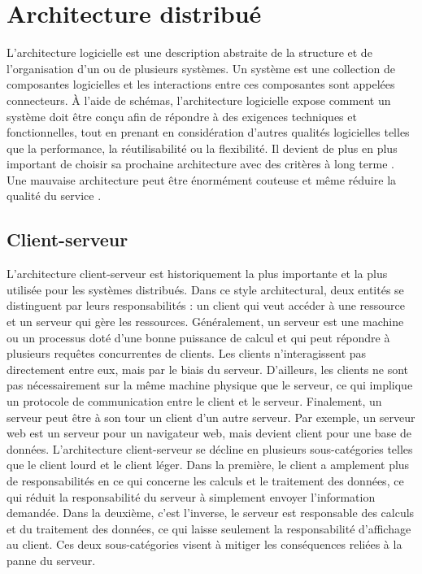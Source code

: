 \section{Architecture distribué}

L'architecture logicielle est une description abstraite de la structure et de l'organisation
d'un ou de plusieurs systèmes. Un système est une collection de composantes logicielles
et les interactions entre ces composantes sont appelées connecteurs. À l'aide de schémas,
l'architecture logicielle expose comment un système doit être conçu aﬁn de répondre à des
exigences techniques et fonctionnelles, tout en prenant en considération d'autres qualités
logicielles telles que la performance, la réutilisabilité ou la ﬂexibilité. Il devient de plus en plus important de choisir sa prochaine architecture avec des critères à long terme \cite{Martens_2010}. Une mauvaise architecture peut être énormément couteuse et même réduire la qualité du service \cite{Kolny_2023}.

\subsection{Client-serveur}
L'architecture client-serveur \cite{Coulouris_2012} est historiquement la plus importante
et la plus utilisée pour les systèmes distribués. Dans ce style architectural, deux entités se
distinguent par leurs responsabilités : un client qui veut accéder à une ressource et un serveur
qui gère les ressources. Généralement, un serveur est une machine ou un processus doté d'une
bonne puissance de calcul et qui peut répondre à plusieurs requêtes concurrentes de clients.
Les clients n'interagissent pas directement entre eux, mais par le biais du serveur. D'ailleurs,
les clients ne sont pas nécessairement sur la même machine physique que le serveur, ce qui
implique un protocole de communication entre le client et le serveur. Finalement, un serveur
peut être à son tour un client d'un autre serveur. Par exemple, un serveur web est un serveur
pour un navigateur web, mais devient client pour une base de données.
L'architecture client-serveur se décline en plusieurs sous-catégories telles que le client lourd
et le client léger. Dans la première, le client a amplement plus de responsabilités en ce qui
concerne les calculs et le traitement des données, ce qui réduit la responsabilité du serveur à
simplement envoyer l'information demandée. Dans la deuxième, c'est l'inverse, le serveur est
responsable des calculs et du traitement des données, ce qui laisse seulement la responsabilité
d'affichage au client. Ces deux sous-catégories visent à mitiger les conséquences reliées à la
panne du serveur.


